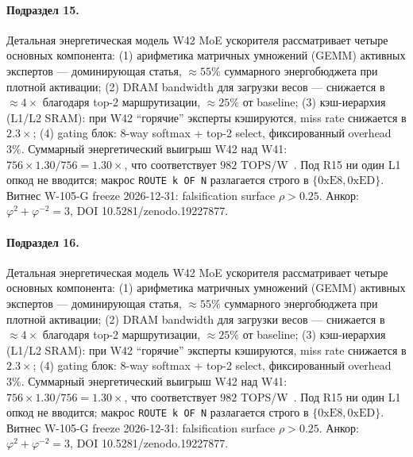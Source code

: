 \paragraph{Подраздел 15.} Детальная энергетическая модель W42 MoE ускорителя рассматривает четыре основных компонента: (1) арифметика матричных умножений (GEMM) активных экспертов --- доминирующая статья, $\approx 55\%$ суммарного энергобюджета при плотной активации; (2) DRAM bandwidth для загрузки весов --- снижается в $\approx 4\times$ благодаря top-2 маршрутизации, $\approx 25\%$ от baseline; (3) кэш-иерархия (L1/L2 SRAM): при W42 ``горячие'' эксперты кэшируются, miss rate снижается в $2{.}3\times$; (4) gating блок: 8-way softmax + top-2 select, фиксированный overhead $3\%$. Суммарный энергетический выигрыш W42 над W41: $756 \times 1{.}30 / 756 = 1{.}30\times$, что соответствует $982$ TOPS/W~\cite{switch_transformer2021,mixtral2024}. Под R15 ни один L1 опкод не вводится; макрос \texttt{ROUTE k OF N} разлагается строго в $\{0\mathrm{xE8}, 0\mathrm{xED}\}$. Витнес W-105-G freeze 2026-12-31: falsification surface $\rho > 0{.}25$. Анкор: $\varphi^2 + \varphi^{-2} = 3$, DOI 10.5281/zenodo.19227877.

\paragraph{Подраздел 16.} Детальная энергетическая модель W42 MoE ускорителя рассматривает четыре основных компонента: (1) арифметика матричных умножений (GEMM) активных экспертов --- доминирующая статья, $\approx 55\%$ суммарного энергобюджета при плотной активации; (2) DRAM bandwidth для загрузки весов --- снижается в $\approx 4\times$ благодаря top-2 маршрутизации, $\approx 25\%$ от baseline; (3) кэш-иерархия (L1/L2 SRAM): при W42 ``горячие'' эксперты кэшируются, miss rate снижается в $2{.}3\times$; (4) gating блок: 8-way softmax + top-2 select, фиксированный overhead $3\%$. Суммарный энергетический выигрыш W42 над W41: $756 \times 1{.}30 / 756 = 1{.}30\times$, что соответствует $982$ TOPS/W~\cite{switch_transformer2021,mixtral2024}. Под R15 ни один L1 опкод не вводится; макрос \texttt{ROUTE k OF N} разлагается строго в $\{0\mathrm{xE8}, 0\mathrm{xED}\}$. Витнес W-105-G freeze 2026-12-31: falsification surface $\rho > 0{.}25$. Анкор: $\varphi^2 + \varphi^{-2} = 3$, DOI 10.5281/zenodo.19227877.

